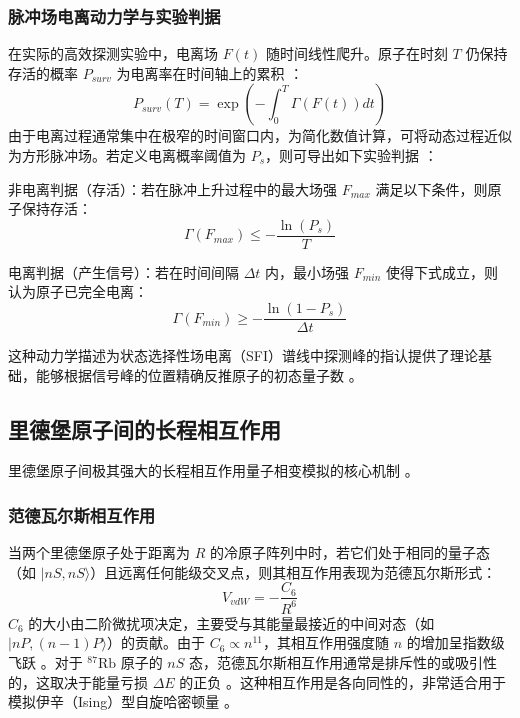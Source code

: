 \documentclass[../main.tex]{subfiles}
\begin{document}
\subsubsection{脉冲场电离动力学与实验判据}

在实际的高效探测实验中，电离场 $F(t)$ 随时间线性爬升。原子在时刻 $T$ 仍保持存活的概率 $P_{surv}$ 为电离率在时间轴上的累积 ：
\begin{equation}
P_{surv}(T) = \exp\left( -\int_0^T \Gamma(F(t)) dt \right)
\end{equation}
由于电离过程通常集中在极窄的时间窗口内，为简化数值计算，可将动态过程近似为方形脉冲场。若定义电离概率阈值为 $P_s$，则可导出如下实验判据 ：

非电离判据（存活）：若在脉冲上升过程中的最大场强 $F_{max}$ 满足以下条件，则原子保持存活：
\begin{equation}
\Gamma(F_{max}) \leq -\frac{\ln(P_s)}{T}
\end{equation}

电离判据（产生信号）：若在时间间隔 $\Delta t$ 内，最小场强 $F_{min}$ 使得下式成立，则认为原子已完全电离：
\begin{equation}
\Gamma(F_{min}) 
\geq -\frac{\ln(1-P_s)}{\Delta t}
\end{equation}

这种动力学描述为状态选择性场电离（SFI）谱线中探测峰的指认提供了理论基础，能够根据信号峰的位置精确反推原子的初态量子数 。

\subsection{里德堡原子间的长程相互作用}

里德堡原子间极其强大的长程相互作用量子相变模拟的核心机制 。

\subsubsection{范德瓦尔斯相互作用}

当两个里德堡原子处于距离为 $R$ 的冷原子阵列中时，若它们处于相同的量子态（如 $|nS, nS\rangle$）且远离任何能级交叉点，则其相互作用表现为范德瓦尔斯形式：
\begin{equation}
V_{vdW} = -\frac{C_6}{R^6}
\end{equation}
$C_6$ 的大小由二阶微扰项决定，主要受与其能量最接近的中间对态（如 $|nP, (n-1)P\rangle$）的贡献。由于 $C_6 \propto n^{11}$，其相互作用强度随 $n$ 的增加呈指数级飞跃 。对于 $^{87}\text{Rb}$ 原子的 $nS$ 态，范德瓦尔斯相互作用通常是排斥性的或吸引性的，这取决于能量亏损 $\Delta E$ 的正负 。这种相互作用是各向同性的，非常适合用于模拟伊辛（Ising）型自旋哈密顿量 。
\end{document}
